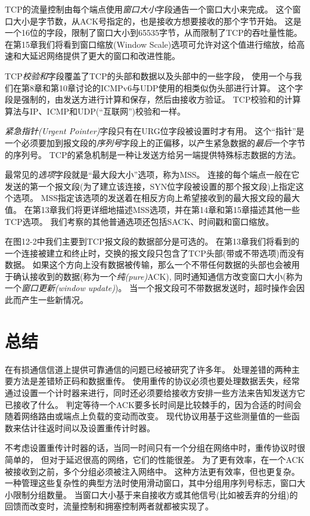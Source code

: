 \documentclass{../main.tex}{subfiles}
\begin{document}
TCP的流量控制由每个端点使用\emph{窗口大小}字段通告一个窗口大小来完成。
这个窗口大小是字节数，从ACK号指定的，也是接收方想要接收的那个字节开始。
这是一个16位的字段，限制了窗口大小到65535字节，从而限制了TCP的吞吐量性能。
在第15章我们将看到窗口缩放(Window Scale)选项可允许对这个值进行缩放，给高速和大延迟网络提供了更大的窗口和改进性能。

TCP\emph{校验和}字段覆盖了TCP的头部和数据以及头部中的一些字段，
    使用一个与我们在第8章和第10章讨论的ICMPv6与UDP使用的相类似伪头部进行计算。
这个字段是强制的，由发送方进行计算和保存，然后由接收方验证。
TCP校验和的计算算法与IP、ICMP和UDP(``互联网'')校验和一样。

\emph{紧急指针(Urgent Pointer)}字段只有在URG位字段被设置时才有用。
这个``指针''是一个必须要加到报文段的\emph{序列号}字段上的正偏移，以产生紧急数据的\emph{最后}一个字节的序列号。
TCP的紧急机制是一种让发送方给另一端提供特殊标志数据的方法。

最常见的\emph{选项}字段就是``最大段大小''选项，称为MSS。
连接的每个端点一般在它发送的第一个报文段(为了建立该连接，SYN位字段被设置的那个报文段)上指定这个选项。
MSS指定该选项的发送着在相反方向上希望接收到的最大报文段的最大值。
在第13章我们将更详细地描述MSS选项，并在第14章和第15章描述其他一些TCP选项。
我们考察的其他普通选项还包括SACK、时间戳和窗口缩放。

在图12-2中我们主要到TCP报文段的数据部分是可选的。
在第13章我们将看到的一个连接被建立和终止时，交换的报文段只包含了TCP头部(带或不带选项)而没有数据。
如果这个方向上没有数据被传输，那么一个不带任何数据的头部也会被用于确认接收到的数据(称为一个\emph{纯(pure)}ACK),
    同时通知通信方改变窗口大小(称为一个\emph{窗口更新(window update)})。
当一个报文段可不带数据发送时，超时操作会因此而产生一些新情况。


\section{总结}
在有损通信信道上提供可靠通信的问题已经被研究了许多年。
处理差错的两种主要方法是差错矫正码和数据重传。
使用重传的协议必须也要处理数据丢失，经常通过设置一个计时器来进行，同时还必须要给接收方安排一些方法来告知发送方它已接收了什么。
判定等待一个ACK要多长时间是比较棘手的，因为合适的时间会随着网络路由或端点上负载的变动而改变。
现代协议用基于这些测量值的一些函数来估计往返时间以及设置重传计时器。

不考虑设置重传计时器的话，当同一时间只有一个分组在网络中时，重传协议时很简单的，
    但对于延迟很高的网络，它们的性能很差。
为了更有效率，在一个ACK被接收到之前，多个分组必须被注入网络中。
这种方法更有效率，但也更复杂。
一种管理这些复杂性的典型方法时使用滑动窗口，其中分组用序列号标志，窗口大小限制分组数量。
当窗口大小基于来自接收方或其他信号(比如被丢弃的分组)的回馈而改变时，流量控制和拥塞控制两者就都被实现了。
\end{document}
